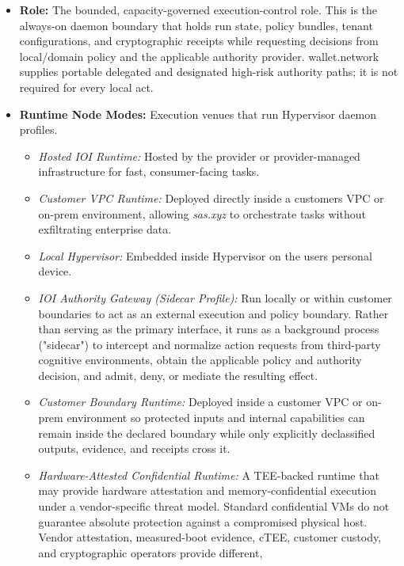 \documentclass[
  11pt,
]{article}
\providecommand{\tightlist}{%
  \setlength{\itemsep}{0pt}\setlength{\parskip}{0pt}}
\begin{document}
\begin{itemize}
\item
  \textbf{Role:} The bounded, capacity-governed execution-control role.
  This is the always-on daemon boundary that holds run state, policy
  bundles, tenant configurations, and cryptographic receipts while
  requesting decisions from local/domain policy and the applicable authority
  provider. wallet.network supplies portable delegated and designated
  high-risk authority paths; it is not required for every local act.
\item
  \textbf{Runtime Node Modes:} Execution venues that run Hypervisor
  daemon profiles.

  \begin{itemize}
  \tightlist
  \item
    \emph{Hosted IOI Runtime:} Hosted by the provider or
    provider-managed infrastructure for fast, consumer-facing tasks.
  \item
    \emph{Customer VPC Runtime:} Deployed directly inside a
    customer\textquotesingle s VPC or on-prem environment, allowing
    \emph{sas.xyz} to orchestrate tasks without exfiltrating enterprise
    data.
  \item
    \emph{Local Hypervisor:} Embedded inside Hypervisor on the
    user\textquotesingle s personal device.
  \item
    \emph{IOI Authority Gateway (Sidecar Profile):} Run locally or
    within customer boundaries to act as an external execution and
    policy boundary. Rather than serving as the primary interface, it
    runs as a background process ("sidecar") to intercept and normalize
    action requests from third-party cognitive environments, obtain the
    applicable policy and authority decision, and admit, deny, or mediate the
    resulting effect.
  \item
    \emph{Customer Boundary Runtime:} Deployed inside a customer VPC or
    on-prem environment so protected inputs and internal capabilities can remain
    inside the declared boundary while only explicitly declassified outputs,
    evidence, and receipts cross it.
  \item
    \emph{Hardware-Attested Confidential Runtime:} A TEE-backed runtime
    that may provide hardware attestation and memory-confidential
    execution under a vendor-specific threat model. Standard
    confidential VMs do not guarantee absolute protection against a
    compromised physical host. Vendor attestation, measured-boot evidence,
    cTEE, customer custody, and cryptographic operators provide different,

\end{itemize}
\end{itemize}
\end{document}
